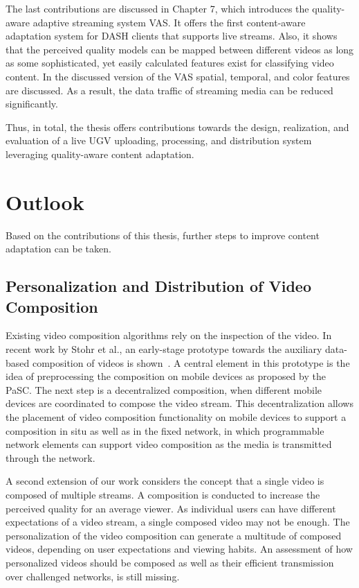 The last contributions are discussed in Chapter 7, which introduces the quality-aware adaptive streaming system \ac{VAS}.
It offers the first content-aware adaptation system for \ac{DASH} clients that supports live streams.
Also, it shows that the perceived quality models can be mapped between different videos as long as some sophisticated, yet easily calculated features exist for classifying video content.
In the discussed version of the \ac{VAS} spatial, temporal, and color features are discussed.
As a result, the data traffic of streaming media can be reduced significantly.

Thus, in total, the thesis offers contributions towards the design, realization, and evaluation of a live \ac{UGV} uploading, processing, and distribution system leveraging quality-aware content adaptation.
\section{Outlook}
Based on the contributions of this thesis, further steps to improve content adaptation can be taken.
\subsection{Personalization and Distribution of Video Composition}
Existing video composition algorithms rely on the inspection of the video.
In recent work by Stohr et al., an early-stage prototype towards the auxiliary data-based composition of videos is shown~\cite{Stohr2016}.
A central element in this prototype is the idea of preprocessing the composition on mobile devices as proposed by the \ac{PaSC}.
The next step is a decentralized composition, when different mobile devices are coordinated to compose the video stream.
This decentralization allows the placement of video composition functionality on mobile devices to support a composition in situ as well as in the fixed network, in which programmable network elements can support video composition as the media is transmitted through the network.

A second extension of our work considers the concept that a single video is composed of multiple streams.
A composition is conducted to increase the perceived quality for an average viewer.
As individual users can have different expectations of a video stream, a single composed video may not be enough.
The personalization of the video composition can generate a multitude of composed videos, depending on user expectations and viewing habits.
An assessment of how personalized videos should be composed as well as their efficient transmission over challenged networks, is still missing.
